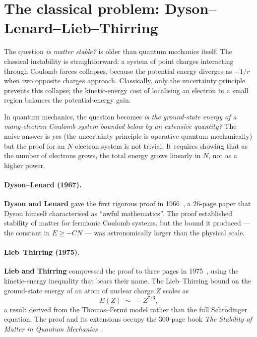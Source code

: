 \section{The classical problem: Dyson--Lenard--Lieb--Thirring}\label{sec:som-classical}

The question \emph{is matter stable?} is older than quantum mechanics itself. The classical instability is straightforward: a system of point charges interacting through Coulomb forces collapses, because the potential energy diverges as $-1/r$ when two opposite charges approach. Classically, only the uncertainty principle prevents this collapse; the kinetic-energy cost of localising an electron to a small region balances the potential-energy gain.

In quantum mechanics, the question becomes \emph{is the ground-state energy of a many-electron Coulomb system bounded below by an extensive quantity?} The naive answer is yes (the uncertainty principle is operative quantum-mechanically) but the proof for an $N$-electron system is not trivial. It requires showing that as the number of electrons grows, the total energy grows linearly in $N$, not as a higher power.

\paragraph{Dyson--Lenard (1967).}
\textbf{Dyson and Lenard} gave the first rigorous proof in 1966~\cite{DysonLenard67}, a 26-page paper that Dyson himself characterised as ``awful mathematics''. The proof established stability of matter for fermionic Coulomb systems, but the bound it produced --- the constant in $E \ge -CN$ --- was astronomically larger than the physical scale.

\paragraph{Lieb--Thirring (1975).}
\textbf{Lieb and Thirring} compressed the proof to three pages in 1975~\cite{LiebThirring75}, using the kinetic-energy inequality that bears their name. The Lieb--Thirring bound on the ground-state energy of an atom of nuclear charge $Z$ scales as
\begin{equation}\label{eq:lieb-thirring}
E(Z) \;\sim\; -Z^{7/3},
\end{equation}
a result derived from the Thomas--Fermi model rather than the full Schr\"odinger equation. The proof and its extensions occupy the 300-page book \emph{The Stability of Matter in Quantum Mechanics}~\cite{LiebSeiringer05}.

